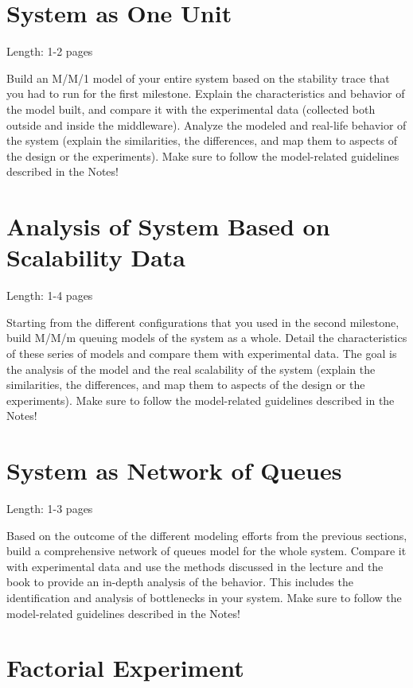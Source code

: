 \documentclass[11pt]{article}
\begin{document}
\pagebreak


\section{System as One Unit}\label{sec:system-one-unit}

Length: 1-2 pages

Build an M/M/1 model of your entire system based on the stability trace that you had to run for the first milestone. Explain the characteristics and behavior of the model built, and compare it with the experimental data (collected both outside and inside the middleware). Analyze the modeled and real-life behavior of the system (explain the similarities, the differences, and map them to aspects of the design or the experiments). Make sure to follow the model-related guidelines described in the Notes!

\section{Analysis of System Based on Scalability Data}\label{sec:analysis-scalability}

Length: 1-4 pages

Starting from the different configurations that you used in the second milestone, build M/M/m queuing models of the system as a whole. Detail the characteristics of these series of models and compare them with experimental data. The goal is the analysis of the model and the real scalability of the system (explain the similarities, the differences, and map them to aspects of the design or the experiments). Make sure to follow the model-related guidelines described in the Notes!

\section{System as Network of Queues}\label{sec:network-of-queues}

Length: 1-3 pages

Based on the outcome of the different modeling efforts from the previous sections, build a comprehensive network of queues model for the whole system. Compare it with experimental data and use the methods discussed in the lecture and the book to provide an in-depth analysis of the behavior. This includes the identification and analysis of bottlenecks in your system. Make sure to follow the model-related guidelines described in the Notes!

\section{Factorial Experiment}\label{sec:2k-experiment}
\end{document}
